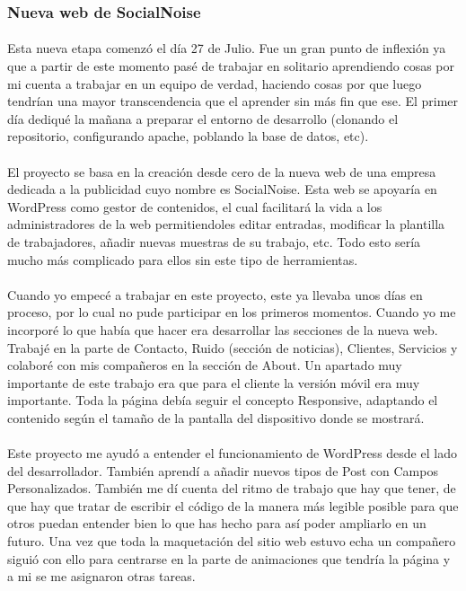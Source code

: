 \documentclass[10pt, a4paper,spanish]{article}
\begin{document}
            \subsubsection{Nueva web de SocialNoise}

                \paragraph{}
                Esta nueva etapa comenzó el día 27 de Julio. Fue un gran punto de inflexión ya que a partir de este momento pasé de trabajar en solitario aprendiendo cosas por mi cuenta a trabajar en un equipo de verdad, haciendo cosas por que luego tendrían una mayor transcendencia que el aprender sin más fin que ese. El primer día dediqué la mañana a preparar el entorno de desarrollo (clonando el repositorio, configurando apache, poblando la base de datos, etc).

                \paragraph{}
                El proyecto se basa en la creación desde cero de la nueva web de una empresa dedicada a la publicidad cuyo nombre es SocialNoise. Esta web se apoyaría en WordPress como gestor de contenidos, el cual facilitará la vida a los administradores de la web permitiendoles editar entradas, modificar la plantilla de trabajadores, añadir nuevas muestras de su trabajo, etc. Todo esto sería mucho más complicado para ellos sin este tipo de herramientas.

                \paragraph{}
                Cuando yo empecé a trabajar en este proyecto, este ya llevaba unos días en proceso, por lo cual no pude participar en los primeros momentos. Cuando yo me incorporé lo que había que hacer era desarrollar las  secciones de la nueva web. Trabajé en la parte de Contacto, Ruido (sección de noticias), Clientes, Servicios y colaboré con mis compañeros en  la sección de About. Un apartado muy importante de este trabajo era que para el cliente la versión móvil era muy importante. Toda la página debía seguir el concepto Responsive, adaptando el contenido según el tamaño de la pantalla del dispositivo donde se mostrará.

                \paragraph{}
                Este proyecto me ayudó a entender el funcionamiento de WordPress desde el lado del desarrollador. También aprendí a añadir nuevos tipos de Post con Campos Personalizados. También me dí cuenta del ritmo de trabajo que hay que tener, de que hay que tratar de escribir el código de la manera más legible posible para que otros puedan entender bien lo que has hecho para así poder ampliarlo en un futuro. Una vez que toda la maquetación del sitio web estuvo echa un compañero siguió con ello para centrarse en la parte de animaciones que tendría la página y a mi se me asignaron otras tareas.
\end{document}
